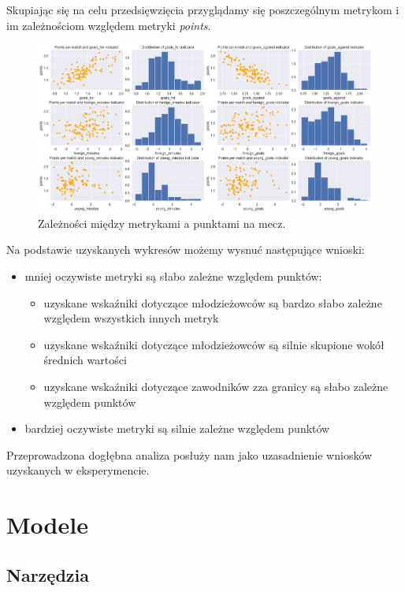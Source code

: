 \documentclass{article}
\begin{document}
Skupiając się na celu przedsięwzięcia przyglądamy się poszczególnym metrykom i im zależnościom względem metryki \textit{points}.

\begin{figure}[h!]
    \centering
    \includegraphics[width=1\textwidth]{dependencies.png}
    \caption{Zależności między metrykami a punktami na mecz.}
    \label{fig:dependencies}
\end{figure}

Na podstawie uzyskanych wykresów możemy wysnuć następujące wnioski:
\begin{itemize}
    \item mniej oczywiste metryki są słabo zależne względem punktów:
    \begin{itemize}
            \item uzyskane wskaźniki dotyczące młodzieżowców są bardzo słabo zależne względem wszystkich innych metryk
            \item uzyskane wskaźniki dotyczące młodzieżowców są silnie skupione wokół średnich wartości
            \item uzyskane wskaźniki dotyczące zawodników zza granicy są słabo zależne względem punktów
    \end{itemize}
    \item bardziej oczywiste metryki są silnie zależne względem punktów
\end{itemize}

Przeprowadzona dogłębna analiza posłuży nam jako uzasadnienie wniosków uzyskanych w eksperymencie.

\section{Modele}

\subsection{Narzędzia}
\end{document}
